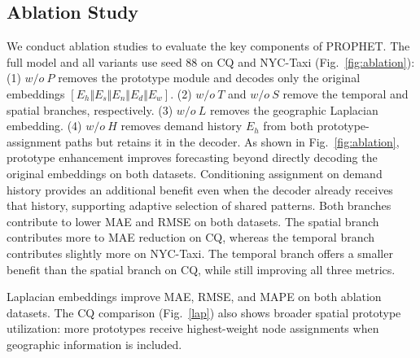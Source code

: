 \subsection{Ablation Study}
We conduct ablation studies to evaluate the key components of PROPHET.
The full model and all variants use seed 88 on CQ and NYC-Taxi (Fig.~\ref{fig:ablation}):
(1) $w/o~P$ removes the prototype module and decodes only the original embeddings $[E_h \Vert E_s \Vert E_n \Vert E_d \Vert E_w]$.
(2) $w/o~T$ and $w/o~S$ remove the temporal and spatial branches, respectively.
(3) $w/o~L$ removes the geographic Laplacian embedding.
(4) $w/o~H$ removes demand history $E_h$ from both prototype-assignment paths but retains it in the decoder.
As shown in Fig.~\ref{fig:ablation}, prototype enhancement improves forecasting beyond directly decoding the original embeddings on both datasets.
Conditioning assignment on demand history provides an additional benefit even when the decoder already receives that history, supporting adaptive selection of shared patterns.
Both branches contribute to lower MAE and RMSE on both datasets.
The spatial branch contributes more to MAE reduction on CQ, whereas the temporal branch contributes slightly more on NYC-Taxi.
The temporal branch offers a smaller benefit than the spatial branch on CQ, while still improving all three metrics.

Laplacian embeddings improve MAE, RMSE, and MAPE on both ablation datasets.
The CQ comparison (Fig.~\ref{lap}) also shows broader spatial prototype utilization: more prototypes receive highest-weight node assignments when geographic information is included.

